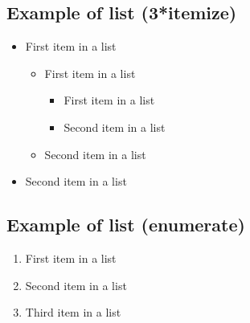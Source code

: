 \documentclass[paper=a4, fontsize=11pt]{scrartcl} %
\numberwithin{equation}{section} %
\numberwithin{figure}{section} %
\numberwithin{table}{section} %
\begin{document}
\subsection{Example of list (3*itemize)}
\begin{itemize}
	\item First item in a list 
		\begin{itemize}
		\item First item in a list 
			\begin{itemize}
			\item First item in a list 
			\item Second item in a list 
			\end{itemize}
		\item Second item in a list 
		\end{itemize}
	\item Second item in a list 
\end{itemize}


\subsection{Example of list (enumerate)}
\begin{enumerate}
\item First item in a list 
\item Second item in a list 
\item Third item in a list
\end{enumerate}

\fi
\end{document}

